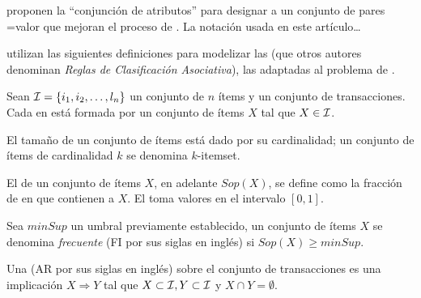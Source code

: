 
\citet{DeshpandeKarypis-UsingConjunctionofAttributeValuesforClassification-2002} proponen la "`conjunción de atributos"' para designar a un conjunto de pares \atributo=valor que mejoran el proceso de \Clasificacion. La notación usada en este artículo\ldots



\citet{HLeonCarrascoHPalancarMTrinidad-DesarrolloDeClasificadoresBasadosEnRA-2010} utilizan las siguientes definiciones para modelizar las \CAR (que otros autores denominan \emph{Reglas de Clasificación Asociativa}), las \ars adaptadas al problema de \Clasificacion.

Sean $\I = \{i_1,i_2,\ldots,l_n\}$ un conjunto de $n$ ítems y \T un conjunto de transacciones. Cada \transaccion en \T está formada por un conjunto de ítems $X$ tal que $X\in\I$.
\begin{Definition}[\Itemset]
  El tamaño de un conjunto de ítems está dado por su cardinalidad; un conjunto de ítems de cardinalidad $k$ se denomina $k$-itemset.
\label{def:itemset}
\end{Definition}

\begin{Definition}[Soporte]
  El \soporte de un conjunto de ítems $X$, en adelante $Sop(X)$, se define como la fracción de \transacciones en \T que contienen a $X$. El \soporte toma valores en el intervalo $[0,1]$.
\label{def:soporte}
\end{Definition}

\begin{Definition}[$minSup$]
  Sea $minSup$ un umbral previamente establecido, un conjunto de ítems $X$ se denomina \emph{frecuente} (FI por sus siglas en inglés) si $Sop(X) \geq minSup$.
\label{def:flujo-de-datos}
\end{Definition}

\begin{Definition}[\AR]
  Una \AR (AR por sus siglas en inglés) sobre el conjunto de transacciones \T es una implicación $X\Rightarrow Y$ tal que $X\subset\I, Y\subset\I$ y $X\cap Y=\emptyset$.
\label{def:reglas-de-asociacion}
\end{Definition}


